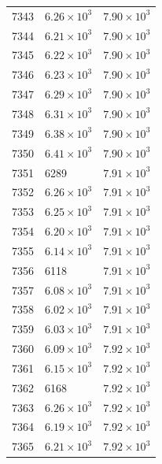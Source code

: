 \begin{table}[H]
\begin{tabular}{lll}
7343 & $\displaystyle 6.26 \times 10^{3}$ & $\displaystyle 7.90 \times 10^{3}$ \\
7344 & $\displaystyle 6.21 \times 10^{3}$ & $\displaystyle 7.90 \times 10^{3}$ \\
7345 & $\displaystyle 6.22 \times 10^{3}$ & $\displaystyle 7.90 \times 10^{3}$ \\
7346 & $\displaystyle 6.23 \times 10^{3}$ & $\displaystyle 7.90 \times 10^{3}$ \\
7347 & $\displaystyle 6.29 \times 10^{3}$ & $\displaystyle 7.90 \times 10^{3}$ \\
7348 & $\displaystyle 6.31 \times 10^{3}$ & $\displaystyle 7.90 \times 10^{3}$ \\
7349 & $\displaystyle 6.38 \times 10^{3}$ & $\displaystyle 7.90 \times 10^{3}$ \\
7350 & $\displaystyle 6.41 \times 10^{3}$ & $\displaystyle 7.90 \times 10^{3}$ \\
7351 & 6289 & $\displaystyle 7.91 \times 10^{3}$ \\
7352 & $\displaystyle 6.26 \times 10^{3}$ & $\displaystyle 7.91 \times 10^{3}$ \\
7353 & $\displaystyle 6.25 \times 10^{3}$ & $\displaystyle 7.91 \times 10^{3}$ \\
7354 & $\displaystyle 6.20 \times 10^{3}$ & $\displaystyle 7.91 \times 10^{3}$ \\
7355 & $\displaystyle 6.14 \times 10^{3}$ & $\displaystyle 7.91 \times 10^{3}$ \\
7356 & 6118 & $\displaystyle 7.91 \times 10^{3}$ \\
7357 & $\displaystyle 6.08 \times 10^{3}$ & $\displaystyle 7.91 \times 10^{3}$ \\
7358 & $\displaystyle 6.02 \times 10^{3}$ & $\displaystyle 7.91 \times 10^{3}$ \\
7359 & $\displaystyle 6.03 \times 10^{3}$ & $\displaystyle 7.91 \times 10^{3}$ \\
7360 & $\displaystyle 6.09 \times 10^{3}$ & $\displaystyle 7.92 \times 10^{3}$ \\
7361 & $\displaystyle 6.15 \times 10^{3}$ & $\displaystyle 7.92 \times 10^{3}$ \\
7362 & 6168 & $\displaystyle 7.92 \times 10^{3}$ \\
7363 & $\displaystyle 6.26 \times 10^{3}$ & $\displaystyle 7.92 \times 10^{3}$ \\
7364 & $\displaystyle 6.19 \times 10^{3}$ & $\displaystyle 7.92 \times 10^{3}$ \\
7365 & $\displaystyle 6.21 \times 10^{3}$ & $\displaystyle 7.92 \times 10^{3}$ \\

\end{tabular}
\end{table}
